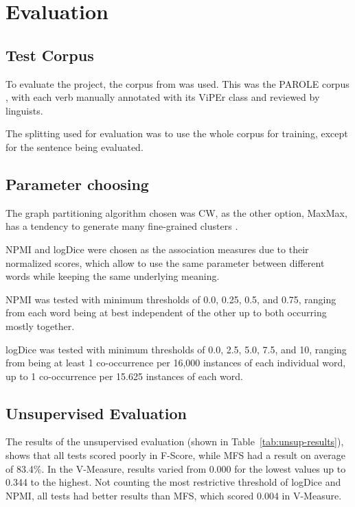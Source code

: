 \chapter{Evaluation}

\section{Test Corpus}

To evaluate the project, the corpus from \cite{pires2017verb} was used. This was
the PAROLE corpus \cite{nascimento1998parole}, with each verb manually annotated
with its ViPEr class and reviewed by linguists.

The splitting used for evaluation was to use the whole corpus for training,
except for the sentence being evaluated.

\section{Parameter choosing}

The graph partitioning algorithm chosen was \ac{CW}, as the other option,
MaxMax, has a tendency to generate many fine-grained clusters
\cite{hope2013uos}.

\ac{NPMI} and logDice were chosen as the association measures due to their
normalized scores, which allow to use the same parameter between different words
while keeping the same underlying meaning.

\ac{NPMI} was tested with minimum thresholds of 0.0, 0.25, 0.5, and 0.75,
ranging from each word being at best independent of the other up to both
occurring mostly together.

logDice was tested with minimum thresholds of 0.0, 2.5, 5.0, 7.5, and 10,
ranging from being at least 1 co-occurrence per 16,000 instances of each
individual word, up to 1 co-occurrence per 15.625 instances of each word.

\section{Unsupervised Evaluation}

The results of the unsupervised evaluation (shown in
Table~\ref{tab:unsup-results}), shows that all tests scored poorly in F-Score,
while \ac{MFS} had a result on average of 83.4\%. In the V-Measure, results
varied from 0.000 for the lowest values up to 0.344 to the highest. Not counting
the most restrictive threshold of logDice and NPMI, all tests had better results
than \ac{MFS}, which scored 0.004 in V-Measure.


